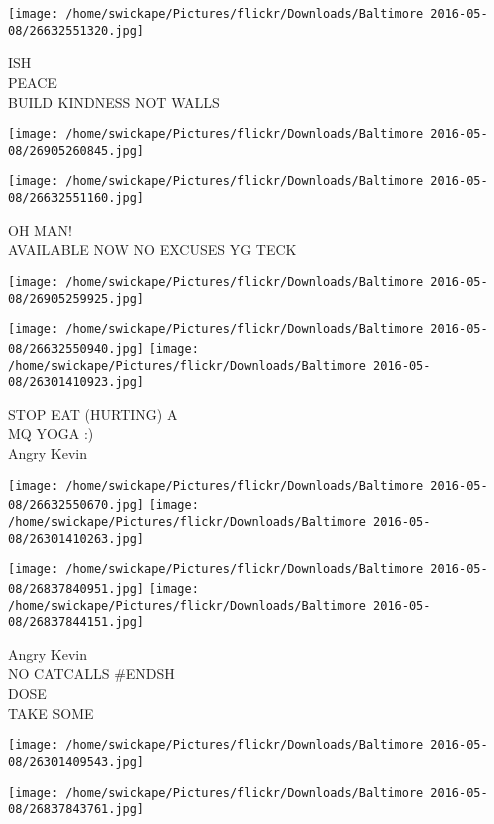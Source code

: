 \documentclass[10pt,letterpaper]{article}
\begin{document}
\texttt{[image: /home/swickape/Pictures/flickr/Downloads/Baltimore 2016-05-08/26632551320.jpg]}

ISH\\
PEACE\\
BUILD KINDNESS NOT WALLS\\
\pagebreak

\texttt{[image: /home/swickape/Pictures/flickr/Downloads/Baltimore 2016-05-08/26905260845.jpg]}

\vspace{0.25in}
\texttt{[image: /home/swickape/Pictures/flickr/Downloads/Baltimore 2016-05-08/26632551160.jpg]}

OH MAN!\\
AVAILABLE NOW NO EXCUSES YG TECK\\
\pagebreak

\texttt{[image: /home/swickape/Pictures/flickr/Downloads/Baltimore 2016-05-08/26905259925.jpg]}

\vspace{0.25in}
\texttt{[image: /home/swickape/Pictures/flickr/Downloads/Baltimore 2016-05-08/26632550940.jpg]}
\texttt{[image: /home/swickape/Pictures/flickr/Downloads/Baltimore 2016-05-08/26301410923.jpg]}

STOP EAT (HURTING) A\\
MQ YOGA :)\\
Angry Kevin\\
\pagebreak

\texttt{[image: /home/swickape/Pictures/flickr/Downloads/Baltimore 2016-05-08/26632550670.jpg]}
\texttt{[image: /home/swickape/Pictures/flickr/Downloads/Baltimore 2016-05-08/26301410263.jpg]}

\texttt{[image: /home/swickape/Pictures/flickr/Downloads/Baltimore 2016-05-08/26837840951.jpg]}
\texttt{[image: /home/swickape/Pictures/flickr/Downloads/Baltimore 2016-05-08/26837844151.jpg]}

Angry Kevin\\
NO CATCALLS \#ENDSH\\
DOSE\\
TAKE SOME\\
\pagebreak

\texttt{[image: /home/swickape/Pictures/flickr/Downloads/Baltimore 2016-05-08/26301409543.jpg]}

\vspace{0.25in}
\texttt{[image: /home/swickape/Pictures/flickr/Downloads/Baltimore 2016-05-08/26837843761.jpg]}
\end{document}
